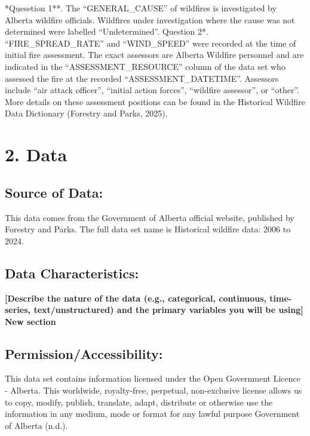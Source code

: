 \documentclass[
]{article}
\begin{document}
\indent **Quesetion 1**. The ``GENERAL\_CAUSE'' of wildfires is
investigated by Alberta wildfire officials. Wildfires under
investigation where the cause was not determined were labelled
``Undetermined''. \indent *Question 2*. ``FIRE\_SPREAD\_RATE'' and
``WIND\_SPEED'' were recorded at the time of initial fire assessment.
The exact assessors are Alberta Wildfire personnel and are indicated in
the ``ASSESSMENT\_RESOURCE'' column of the data set who assessed the
fire at the recorded ``ASSESSMENT\_DATETIME''. Assessors include ``air
attack officer'', ``initial action forces'', ``wildfire assessor'', or
``other''. More details on these assessment positions can be found in
the Historical Wildfire Data Dictionary (Forestry and Parks, 2025).

\section{2. Data}\label{data}

\subsection{Source of Data:}\label{source-of-data}

\indent This data comes from the Government of Alberta official website,
published by Forestry and Parks. The full data set name is Historical
wildfire data: 2006 to 2024.

\subsection{Data Characteristics:}\label{data-characteristics}

\textbf{{[}Describe the nature of the data (e.g., categorical,
continuous, time-series, text/unstructured) and the primary variables
you will be using{]}} \textbf{New section}

\subsection{Permission/Accessibility:}\label{permissionaccessibility}

\indent This data set contains information licensed under the Open
Government Licence - Alberta. This worldwide, royalty-free, perpetual,
non-exclusive license allows us to copy, modify, publish, translate,
adapt, distribute or otherwise use the information in any medium, mode
or format for any lawful purpose {Government of Alberta (n.d.)}.
\end{document}
